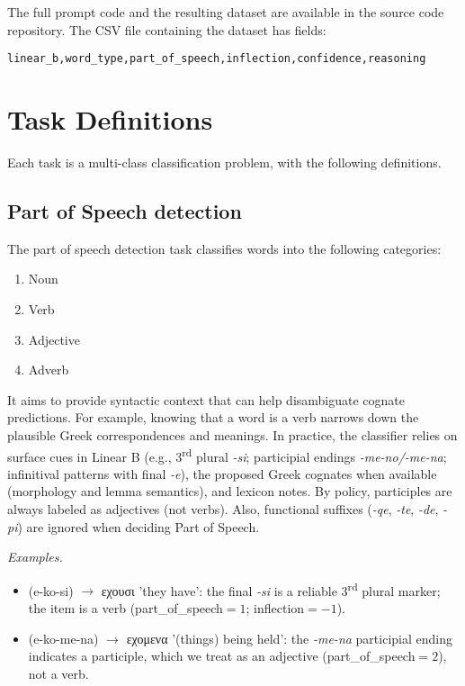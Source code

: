 The full prompt code and the resulting dataset are available in the source code repository.
The CSV file containing the dataset has fields:
\begin{verbatim}
linear_b,word_type,part_of_speech,inflection,confidence,reasoning
\end{verbatim}

\section{Task Definitions}
Each task is a multi-class classification problem, with the following definitions.
\subsection{Part of Speech detection}
The part of speech detection task classifies words into the following categories:
\begin{enumerate}[start=0]
    \item Noun
    \item Verb
    \item Adjective
    \item Adverb
\end{enumerate}
It aims to provide syntactic context that can help disambiguate cognate predictions.
For example, knowing that a word is a verb narrows down the plausible Greek correspondences and meanings.
In practice, the classifier relies on surface cues in Linear B (e.g., 3\textsuperscript{rd} plural \textit{-si}; participial endings \textit{-me-no/-me-na}; infinitival patterns with final \textit{-e}), the proposed Greek cognates when available (morphology and lemma semantics), and lexicon notes. By policy, participles are always labeled as adjectives (not verbs). Also, functional suffixes (\textit{-qe}, \textit{-te}, \textit{-de}, \textit{-pi}) are ignored when deciding Part of Speech.

\textit{Examples.}
\begin{itemize}
  \item \textlinb{\Be\Bko\Bsi}(e-ko-si) $\rightarrow$ \textgreek{εχουσι} 'they have': the final \textit{-si} is a reliable 3\textsuperscript{rd} plural marker; the item is a verb (part\_of\_speech$=1$; inflection$=-1$).
  \item \textlinb{\Be\Bko\Bme\Bna}(e-ko-me-na) $\rightarrow$ \textgreek{εχομενα} '(things) being held': the \textit{-me-na} participial ending indicates a  participle, which we treat as an adjective (part\_of\_speech$=2$), not a verb.
\end{itemize}

